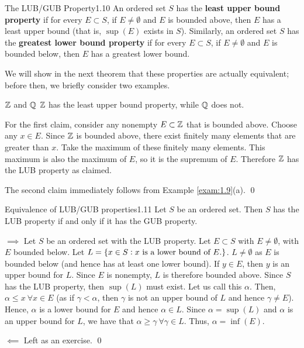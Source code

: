 \begin{definition}{The LUB/GUB Property}{1.10}
    An ordered set $S$ has the \textbf{least upper bound property} if for every $E \subset S$, if $E \neq \emptyset$ and $E$ is bounded above, then $E$ has a least upper bound (that is, $\sup(E)$ exists in $S$). Similarly, an ordered set $S$ has the \textbf{greatest lower bound property} if for every $E \subset S$, if $E \neq \emptyset$ and $E$ is bounded below, then $E$ has a greatest lower bound.
\end{definition}
We will show in the next theorem that these properties are actually equivalent; before then, we briefly consider two examples.
\begin{nexample}{$\mathbb{Z}$ and $\mathbb{Q}$}
    $\mathbb{Z}$ has the least upper bound property, while $\mathbb{Q}$ does not. 
\end{nexample}
\begin{nproof}
    For the first claim, consider any nonempty $E \subset \mathbb{Z}$ that is bounded above. Choose any $x \in E$. Since $\mathbb{Z}$ is bounded above, there exist finitely many elements that are greater than $x$. Take the maximum of these finitely many elements. This maximum is also the maximum of $E$, so it is the supremum of $E$. Therefore $\mathbb{Z}$ has the LUB property as claimed.
    
    The second claim immediately follows from Example \ref{exam:1.9}(a). \qed
\end{nproof}

\begin{theorem}{Equivalence of LUB/GUB properties}{1.11}
    Let $S$ be an ordered set. Then $S$ has the LUB property if and only if it has the GUB property. 
\end{theorem}
\begin{nproof}
    $\boxed{\implies}$ Let $S$ be an ordered set with the LUB property. Let $E \subset S$ with $E \neq \emptyset$, with $E$ bounded below. Let $L = \set{x \in S: x\text{ is a lower bound of $E$.}}$. $L \neq \emptyset$ as $E$ is bounded below (and hence has at least one lower bound). If $y \in E$, then $y$ is an upper bound for $L$. Since $E$ is nonempty, $L$ is therefore bounded above. Since $S$ has the LUB property, then $\sup(L)$ must exist. Let us call this $\alpha$. Then, $\alpha \leq x\ \forall x \in E$ (as if $\gamma < \alpha$, then $\gamma$ is not an upper bound of $L$ and hence $\gamma \neq E$). Hence, $\alpha$ is a lower bound for $E$ and hence $\alpha \in L$. Since $\alpha = \sup(L)$ and $\alpha$ is an upper bound for $L$, we have that $\alpha \geq \gamma\ \forall \gamma \in L$. Thus, $\alpha = \inf(E)$. 

    $\boxed{\impliedby}$ Left as an exercise. \qed
\end{nproof}

